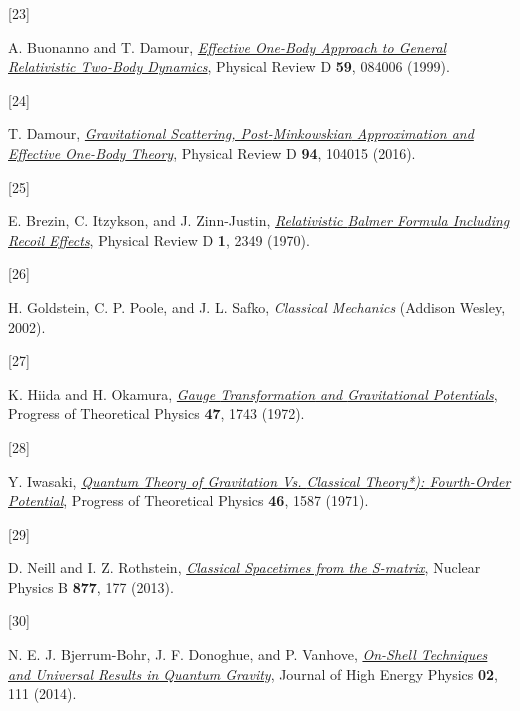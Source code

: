 \documentclass[
  10pt,
  a4paper,
  DIV=11,
  numbers=noendperiod,
  oneside]{scrreprt}
\newlength{\cslhangindent}
\newlength{\csllabelwidth}
\newlength{\cslentryspacingunit} %
\newenvironment{CSLReferences}[2] %
 {%
  \setlength{\parindent}{0pt}
  \ifodd #1
  \let\oldpar\par
  \def\par{\hangindent=\cslhangindent\oldpar}
  \fi
  \setlength{\parskip}{#2\cslentryspacingunit}
 }%
 {}
\newcommand{\CSLLeftMargin}[1]{\parbox[t]{\csllabelwidth}{#1}}
\newcommand{\CSLRightInline}[1]{\parbox[t]{\linewidth - \csllabelwidth}{#1}\break}
\DeclareRobustCommand{\[}{\begin{equation}}
\DeclareRobustCommand{\]}{\end{equation}}
\begin{document}
\begin{CSLReferences}{0}{0}
\leavevmode{}%
\CSLLeftMargin{{[}23{]} }%
\CSLRightInline{A. Buonanno and T. Damour,
\emph{\href{https://doi.org/10.1103/PhysRevD.59.084006}{Effective
One-Body Approach to General Relativistic Two-Body Dynamics}}, Physical
Review D \textbf{59}, 084006 (1999).}

\leavevmode{}%
\CSLLeftMargin{{[}24{]} }%
\CSLRightInline{T. Damour,
\emph{\href{https://doi.org/10.1103/PhysRevD.94.104015}{Gravitational
Scattering, Post-{Minkowskian} Approximation and {Effective One-Body}
Theory}}, Physical Review D \textbf{94}, 104015 (2016).}

\leavevmode{}%
\CSLLeftMargin{{[}25{]} }%
\CSLRightInline{E. Brezin, C. Itzykson, and J. Zinn-Justin,
\emph{\href{https://doi.org/10.1103/PhysRevD.1.2349}{Relativistic
{Balmer Formula Including Recoil Effects}}}, Physical Review D
\textbf{1}, 2349 (1970).}

\leavevmode{}%
\CSLLeftMargin{{[}26{]} }%
\CSLRightInline{H. Goldstein, C. P. Poole, and J. L. Safko,
\emph{Classical {Mechanics}} ({Addison Wesley}, 2002).}

\leavevmode{}%
\CSLLeftMargin{{[}27{]} }%
\CSLRightInline{K. Hiida and H. Okamura,
\emph{\href{https://doi.org/10.1143/PTP.47.1743}{Gauge {Transformation}
and {Gravitational Potentials}}}, Progress of Theoretical Physics
\textbf{47}, 1743 (1972).}

\leavevmode{}%
\CSLLeftMargin{{[}28{]} }%
\CSLRightInline{Y. Iwasaki,
\emph{\href{https://doi.org/10.1143/PTP.46.1587}{Quantum {Theory} of
{Gravitation} Vs. {Classical Theory}*): {Fourth-Order Potential}}},
Progress of Theoretical Physics \textbf{46}, 1587 (1971).}

\leavevmode{}%
\CSLLeftMargin{{[}29{]} }%
\CSLRightInline{D. Neill and I. Z. Rothstein,
\emph{\href{https://doi.org/10.1016/j.nuclphysb.2013.09.007}{Classical
Space\textendash times from the {S-matrix}}}, Nuclear Physics B
\textbf{877}, 177 (2013).}

\leavevmode{}%
\CSLLeftMargin{{[}30{]} }%
\CSLRightInline{N. E. J. Bjerrum-Bohr, J. F. Donoghue, and P. Vanhove,
\emph{\href{https://doi.org/10.1007/JHEP02(2014)111}{On-Shell Techniques
and Universal Results in Quantum Gravity}}, Journal of High Energy
Physics \textbf{02}, 111 (2014).}


\end{CSLReferences}
\end{document}
